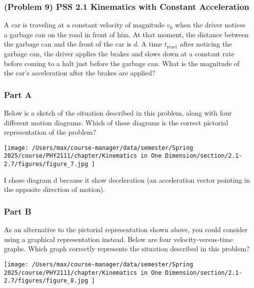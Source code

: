 \newpage

\subsubsection{(Problem 9) PSS 2.1 Kinematics with Constant Acceleration}
A car is traveling at a constant velocity of magnitude $v_0$ when the driver notices a garbage can on the road in front of him. At that moment, the distance between the garbage can and the front of the car is $d$. A time $t_{\mathrm{react}}$ after noticing the garbage can, the driver applies the brakes and slows down at a constant rate before coming to a halt just before the garbage can. What is the magnitude of the car's acceleration after the brakes are applied?

\subsubsection{Part A}
Below is a sketch of the situation described in this problem, along with four different motion diagrams. Which of these diagrams is the correct pictorial representation of the problem?

\begin{center}
	\texttt{[image: /Users/max/course-manager/data/semester/Spring 2025/course/PHY2111/chapter/Kinematics in One Dimension/section/2.1-2.7/figures/figure\_7.jpg
	]}
\end{center}

\begin{solution}
	I chose diagram d because it show deceleration (an acceleration vector pointing in the opposite direction of motion).
\end{solution}

\subsubsection{Part B}
As an alternative to the pictorial representation shown above, you could consider using a graphical representation instead. Below are four velocity-versus-time graphs. Which graph correctly represents the situation described in this problem?

\begin{center}
	\texttt{[image: /Users/max/course-manager/data/semester/Spring 2025/course/PHY2111/chapter/Kinematics in One Dimension/section/2.1-2.7/figures/figure\_8.jpg
	]}
\end{center}

